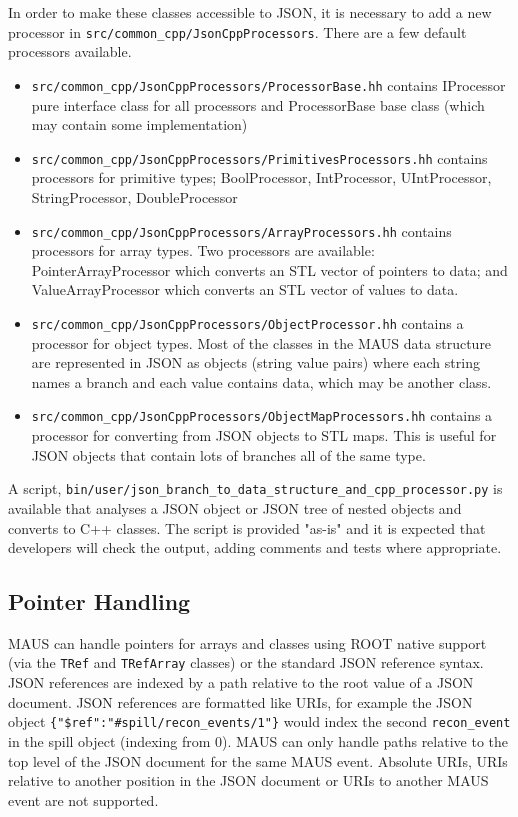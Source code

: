 In order to make these classes accessible to JSON, it is necessary to add a new processor in \verb|src/common_cpp/JsonCppProcessors|. There are a few default processors available.
\begin{itemize}
\item \verb|src/common_cpp/JsonCppProcessors/ProcessorBase.hh| contains IProcessor pure interface class for all processors and ProcessorBase base class (which may contain some implementation)
\item \verb|src/common_cpp/JsonCppProcessors/PrimitivesProcessors.hh| contains processors for primitive types; BoolProcessor, IntProcessor, UIntProcessor, StringProcessor, DoubleProcessor
\item \verb|src/common_cpp/JsonCppProcessors/ArrayProcessors.hh| contains processors for array types. Two processors are available: PointerArrayProcessor which converts an STL vector of pointers to data; and ValueArrayProcessor which converts an STL vector of values to data.
\item \verb|src/common_cpp/JsonCppProcessors/ObjectProcessor.hh| contains a processor for object types. Most of the classes in the MAUS data structure are represented in JSON as objects (string value pairs) where each string names a branch and each value contains data, which may be another class.
\item \verb|src/common_cpp/JsonCppProcessors/ObjectMapProcessors.hh| contains a processor for converting from JSON objects to STL maps. This is useful for JSON objects that contain lots of branches all of the same type.
\end{itemize}

A script, \verb|bin/user/json_branch_to_data_structure_and_cpp_processor.py| is available that analyses a JSON object or JSON tree of nested objects and converts to C++ classes. The script is provided "as-is" and it is expected that developers will check the output, adding comments and tests where appropriate.

\subsection{Pointer Handling}
MAUS can handle pointers for arrays and classes using ROOT native support
(via the \verb|TRef| and \verb|TRefArray| classes)
or the standard JSON reference syntax. 
JSON references are indexed by a path relative to the root value of a JSON document. 
JSON references are formatted like URIs, 
for example the JSON object \verb|{"$ref":"#spill/recon_events/1"}| 
would index the second \verb|recon_event| in the spill object (indexing from 0). 
MAUS can only handle paths relative to the top level of the JSON document for the same MAUS event. 
Absolute URIs, URIs relative to another position in the JSON document or URIs to another MAUS event are not supported. 

